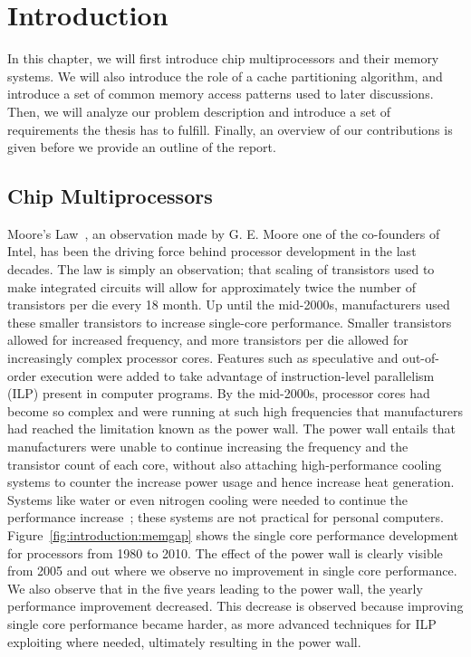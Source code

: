 \chapter{Introduction}
\label{cpt:introduction}

In this chapter, we will first introduce chip multiprocessors and their memory systems.
We will also introduce the role of a cache partitioning algorithm, and introduce a set of common memory access patterns used to later discussions.
Then, we will analyze our problem description and introduce a set of requirements the thesis has to fulfill.
Finally, an overview of our contributions is given before we provide an outline of the report.

\section{Chip Multiprocessors}

Moore's Law~\cite{Moore1998}, an observation made by G. E. Moore one of the co-founders of Intel, has been the driving force behind processor development in the last decades.
The law is simply an observation; that scaling of transistors used to make integrated circuits will allow for approximately twice the number of transistors per die every 18 month.
Up until the mid-2000s, manufacturers used these smaller transistors to increase single-core performance.
Smaller transistors allowed for increased frequency, and more transistors per die allowed for increasingly complex processor cores.
Features such as speculative and out-of-order execution were added to take advantage of instruction-level parallelism (ILP) present in computer programs.
By the mid-2000s, processor cores had become so complex and were running at such high frequencies that manufacturers had reached the limitation known as the power wall.
The power wall entails that manufacturers were unable to continue increasing the frequency and the transistor count of each core, without also attaching high-performance cooling systems to counter the increase power usage and hence increase heat generation.
Systems like water or even nitrogen cooling were needed to continue the performance increase~\cite{Sutter2005}; these systems are not practical for personal computers.
Figure~\ref{fig:introduction:memgap} shows the single core performance development for processors from 1980 to 2010.
The effect of the power wall is clearly visible from 2005 and out where we observe no improvement in single core performance.
We also observe that in the five years leading to the power wall, the yearly performance improvement decreased.
This decrease is observed because improving single core performance became harder, as more advanced techniques for ILP exploiting where needed, ultimately resulting in the power wall.

